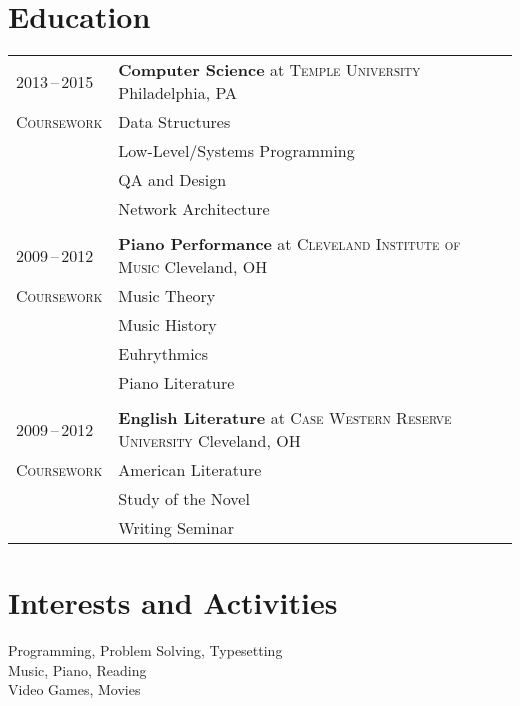 \documentclass[a4paper,10pt]{article}
\begin{document}
\section{Education}
\begin{tabularx}{\textwidth}{@{}p{6em}|X@{}}
    2013\,--\,2015 & \textbf{Computer Science} at \textsc{Temple University} \hfill Philadelphia, PA \\
    \textsc{Coursework} & \footnotesize{Data Structures} \\
    & \footnotesize{Low-Level/Systems Programming} \\
    & \footnotesize{QA and Design} \\
    & \footnotesize{Network Architecture} \\
    \multicolumn{2}{c}{} \\
    2009\,--\,2012 & \textbf{Piano Performance} at \textsc{Cleveland Institute of Music} \hfill Cleveland, OH \\
    \textsc{Coursework} & \footnotesize{Music Theory} \\
    & \footnotesize{Music History} \\
    & \footnotesize{Euhrythmics} \\
    & \footnotesize{Piano Literature} \\
    \multicolumn{2}{c}{} \\
    2009\,--\,2012 & \textbf{English Literature} at \textsc{Case Western Reserve University} \hfill Cleveland, OH \\
    \textsc{Coursework} & \footnotesize{American Literature} \\
    & \footnotesize{Study of the Novel} \\
    & \footnotesize{Writing Seminar}
\end{tabularx}

\section{Interests and Activities}
Programming, Problem Solving, Typesetting \\
Music, Piano, Reading \\
Video Games, Movies
\end{document}

